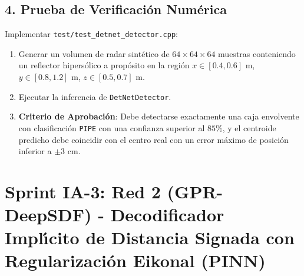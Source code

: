 \documentclass[11pt,a4paper]{article}
\begin{document}
\subsection{4. Prueba de Verificaci{\'o}n Num{\'e}rica}
Implementar \texttt{test/test\_detnet\_detector.cpp}:
\begin{enumerate}
    \item Generar un volumen de radar sint{\'e}tico de $64 \times 64 \times 64$ muestras conteniendo un reflector hipers{\'o}lico a prop{\'o}sito en la regi{\'o}n $x \in [0.4, 0.6]\text{ m}$, $y \in [0.8, 1.2]\text{ m}$, $z \in [0.5, 0.7]\text{ m}$.
    \item Ejecutar la inferencia de \texttt{DetNetDetector}.
    \item \textbf{Criterio de Aprobaci{\'o}n}: Debe detectarse exactamente una caja envolvente con clasificaci{\'o}n \texttt{PIPE} con una confianza superior al $85\%$, y el centroide predicho debe coincidir con el centro real con un error m{\'a}ximo de posici{\'o}n inferior a $\pm 3\text{ cm}$.
\end{enumerate}

\newpage

\section{Sprint IA-3: Red 2 (GPR-DeepSDF) - Decodificador Impl{\'\i}cito de Distancia Signada con Regularizaci{\'o}n Eikonal (PINN)}
\end{document}
